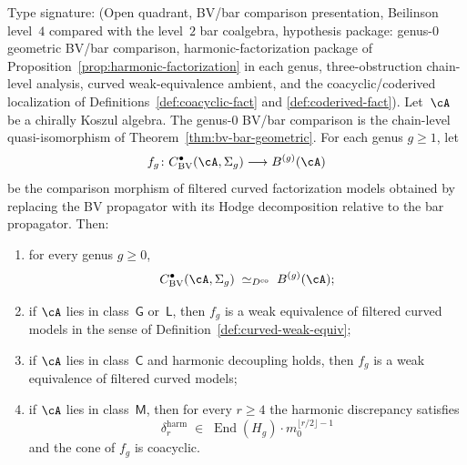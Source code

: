 \begin{theorem}[BV$=$bar in the coderived category;
\ClaimStatusConditional]%
\label{thm:bv-bar-coderived-vol1}%
%
%
Type signature: \textup{(}Open quadrant, BV/bar comparison
presentation, Beilinson level~$4$ compared with the level~$2$
bar coalgebra, hypothesis package: genus-$0$ geometric BV/bar
comparison, harmonic-factorization package of
Proposition~\textup{\ref{prop:harmonic-factorization}} in each genus,
three-obstruction chain-level analysis, curved weak-equivalence
ambient, and the coacyclic/coderived localization of
Definitions~\textup{\ref{def:coacyclic-fact}} and
\textup{\ref{def:coderived-fact}}\textup{)}.
Let~$\cA$ be a chirally Koszul algebra. The genus-$0$ BV/bar
comparison is the chain-level quasi-isomorphism of
Theorem~\ref{thm:bv-bar-geometric}. For each genus
$g \geq 1$, let
\[
 f_g \colon
 C^{\bullet}_{\mathrm{BV}}(\cA, \Sigma_g)
 \longrightarrow
 B^{(g)}(\cA)
\]
be the comparison morphism of filtered curved
factorization models
obtained by replacing the BV propagator with its Hodge
decomposition relative to the bar propagator. Then:
\begin{enumerate}[label=\textup{(\roman*)}]
\item for every genus $g \geq 0$,
\[
 C^{\bullet}_{\mathrm{BV}}(\cA, \Sigma_g)
 \;\simeq_{D^{\mathrm{co}}}\;
 B^{(g)}(\cA);
\]
\item if $\cA$ lies in class~$\mathsf{G}$ or~$\mathsf{L}$, then
 $f_g$ is a weak equivalence of filtered curved models in the sense
 of Definition~\ref{def:curved-weak-equiv};
\item if $\cA$ lies in class~$\mathsf{C}$ and harmonic decoupling
 holds, then $f_g$ is a weak equivalence of filtered curved models;
\item if $\cA$ lies in class~$\mathsf{M}$, then for every $r \geq 4$
 the harmonic discrepancy satisfies
\[
 \delta_r^{\mathrm{harm}}
 \;\in\;
 \operatorname{End}(H_g)\cdot m_0^{\lfloor r/2 \rfloor - 1}
\]
and the cone of $f_g$ is coacyclic.
\end{enumerate}
\end{theorem}

